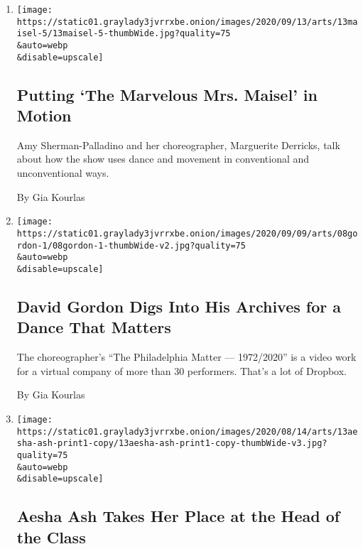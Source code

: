 \begin{enumerate}
\def\labelenumi{\arabic{enumi}.}
\item
  \href{/2020/09/09/arts/dance/mrs-maisel-amy-sherman-palladino-marguerite-derricks.html}{}

  \texttt{[image: https://static01.graylady3jvrrxbe.onion/images/2020/09/13/arts/13maisel-5/13maisel-5-thumbWide.jpg?quality=75\\\&auto=webp\\\&disable=upscale]}

  \hypertarget{putting-the-marvelous-mrs-maisel-in-motion}{%
  \subsection{Putting `The Marvelous Mrs. Maisel' in
  Motion}\label{putting-the-marvelous-mrs-maisel-in-motion}}

  Amy Sherman-Palladino and her choreographer, Marguerite Derricks, talk
  about how the show uses dance and movement in conventional and
  unconventional ways.

  By Gia Kourlas
\item
  \href{/2020/09/08/arts/dance/david-gordon-philadelphia-matters.html}{}

  \texttt{[image: https://static01.graylady3jvrrxbe.onion/images/2020/09/09/arts/08gordon-1/08gordon-1-thumbWide-v2.jpg?quality=75\\\&auto=webp\\\&disable=upscale]}

  \hypertarget{david-gordon-digs-into-his-archives-for-a-dance-that-matters}{%
  \subsection{David Gordon Digs Into His Archives for a Dance That
  Matters}\label{david-gordon-digs-into-his-archives-for-a-dance-that-matters}}

  The choreographer's ``The Philadelphia Matter --- 1972/2020'' is a
  video work for a virtual company of more than 30 performers. That's a
  lot of Dropbox.

  By Gia Kourlas
\item
  \href{/2020/08/13/arts/dance/aesha-ash-american-ballet-faculty.html}{}

  \texttt{[image: https://static01.graylady3jvrrxbe.onion/images/2020/08/14/arts/13aesha-ash-print1-copy/13aesha-ash-print1-copy-thumbWide-v3.jpg?quality=75\\\&auto=webp\\\&disable=upscale]}

  \hypertarget{aesha-ash-takes-her-place-at-the-head-of-the-class}{%
  \subsection{Aesha Ash Takes Her Place at the Head of the
  Class}\label{aesha-ash-takes-her-place-at-the-head-of-the-class}}


\end{enumerate}
